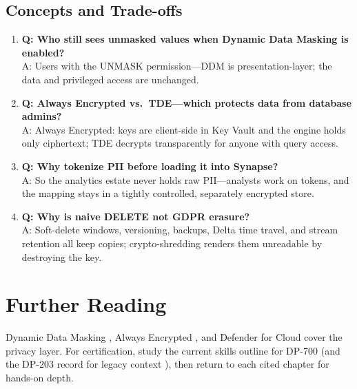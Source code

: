 \subsection{Concepts and Trade-offs}
\begin{enumerate}
    \item \textbf{Q: Who still sees unmasked values when Dynamic Data Masking is enabled?}\\
    A: Users with the UNMASK permission---DDM is presentation-layer; the data and privileged access are unchanged.
    \item \textbf{Q: Always Encrypted vs.\ TDE---which protects data from database admins?}\\
    A: Always Encrypted: keys are client-side in Key Vault and the engine holds only ciphertext; TDE decrypts transparently for anyone with query access.
    \item \textbf{Q: Why tokenize PII before loading it into Synapse?}\\
    A: So the analytics estate never holds raw PII---analysts work on tokens, and the mapping stays in a tightly controlled, separately encrypted store.
    \item \textbf{Q: Why is naive DELETE not GDPR erasure?}\\
    A: Soft-delete windows, versioning, backups, Delta time travel, and stream retention all keep copies; crypto-shredding renders them unreadable by destroying the key.
\end{enumerate}

\section{Further Reading}
Dynamic Data Masking \cite{microsoft2025ddm}, Always Encrypted \cite{microsoft2025alwaysEncrypted}, and Defender for Cloud \cite{microsoft2025defender} cover the privacy layer. For certification, study the current skills outline for DP-700 \cite{microsoft2025dp700} (and the DP-203 record for legacy context \cite{microsoft2025dp203}), then return to each cited chapter for hands-on depth.

